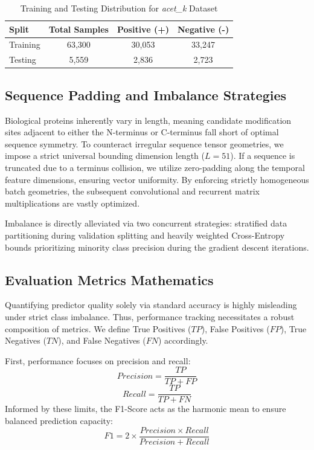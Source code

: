 \documentclass[conference]{IEEEtran}
\begin{document}
\begin{table}[h]
\centering
\caption{Training and Testing Distribution for \textit{acet\_k} Dataset}
\label{tab:datasets}
\begin{tabular}{@{}lccc@{}}
\toprule
\textbf{Split} & \textbf{Total Samples} & \textbf{Positive (+)} & \textbf{Negative (-)} \\ \midrule
Training       & 63,300                 & 30,053                & 33,247                \\
Testing        & 5,559                  & 2,836                 & 2,723                 \\ \bottomrule
\end{tabular}
\end{table}

\subsection{Sequence Padding and Imbalance Strategies}
Biological proteins inherently vary in length, meaning candidate modification sites adjacent to either the N-terminus or C-terminus fall short of optimal sequence symmetry. To counteract irregular sequence tensor geometries, we impose a strict universal bounding dimension length ($L=51$). If a sequence is truncated due to a terminus collision, we utilize zero-padding along the temporal feature dimensions, ensuring vector uniformity. By enforcing strictly homogeneous batch geometries, the subsequent convolutional and recurrent matrix multiplications are vastly optimized.

Imbalance is directly alleviated via two concurrent strategies: stratified data partitioning during validation splitting and heavily weighted Cross-Entropy bounds prioritizing minority class precision during the gradient descent iterations. 

\subsection{Evaluation Metrics Mathematics}
Quantifying predictor quality solely via standard accuracy is highly misleading under strict class imbalance. Thus, performance tracking necessitates a robust composition of metrics. We define True Positives ($TP$), False Positives ($FP$), True Negatives ($TN$), and False Negatives ($FN$) accordingly.

First, performance focuses on precision and recall:
\begin{equation}
Precision = \frac{TP}{TP + FP}
\end{equation}
\begin{equation}
Recall = \frac{TP}{TP + FN}
\end{equation}
Informed by these limits, the F1-Score acts as the harmonic mean to ensure balanced prediction capacity:
\begin{equation}
F1 = 2 \times \frac{Precision \times Recall}{Precision + Recall}
\end{equation}
\end{document}
